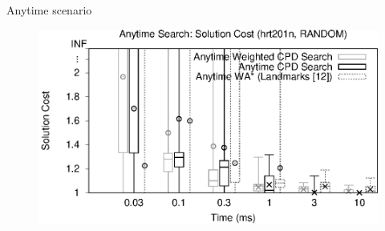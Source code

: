 \begin{frame}{Anytime scenario}
    \begin{figure}
        \centering
        \includegraphics[width=1.0\textwidth]{src/images/anytime/anytime01}
        \label{fig:anytime01}
    \end{figure}
\end{frame}

